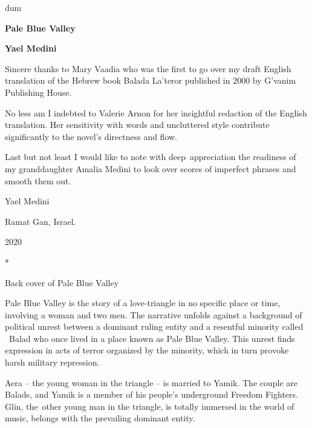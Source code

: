 \documentclass[twoside,11pt]{book}
\begin{document}
\thispagestyle{empty}
{\nullfont dum}
\vspace{.3\textheight}
\begin{center}
{\Huge \textbf{Pale Blue Valley}}

\bigskip

\textbf{\Large Yael Medini}
\end{center}
\vspace{.2\textheight}

Sincere thanks to Mary Vaadia who was the first to go over my draft English translation of the Hebrew book
{\textquotedbl}Balada La'teror{\textquotedbl} published in 2000 by G'vanim Publishing House.


\bigskip

No less am I indebted to Valerie Arnon for her insightful redaction of the English translation. Her sensitivity with
words and uncluttered style contribute significantly to the novel's directness and flow.


\bigskip

{Last but not least I would like to note with deep~appreciation the
readiness of my granddaughter Amalia Medini to look over scores of imperfect phrases and smooth them out}.


\bigskip

Yael Medini

Ramat Gan, Israel.

2020


\bigskip


\bigskip


\bigskip

*


\bigskip

{Back cover of Pale Blue Valley}


\bigskip

{Pale Blue Valley is the story of a love-triangle in no specific place
or time, involving a woman and two men. The narrative unfolds against a background of political unrest between a
dominant ruling entity and a resentful minority called \ Balad who once lived in a place known as Pale Blue Valley.
This unrest finds expression in acts of terror organized by the minority, which in turn provoke harsh military
repression.}

{Aera -- the young woman in the triangle -- is married to Yamik. The
couple are Balads, and Yamik is a member of his people's underground Freedom Fighters. Glin, the\ other young man in
the triangle, is totally immersed in the world of music, belongs with the prevailing dominant entity.\ \ }
\end{document}
